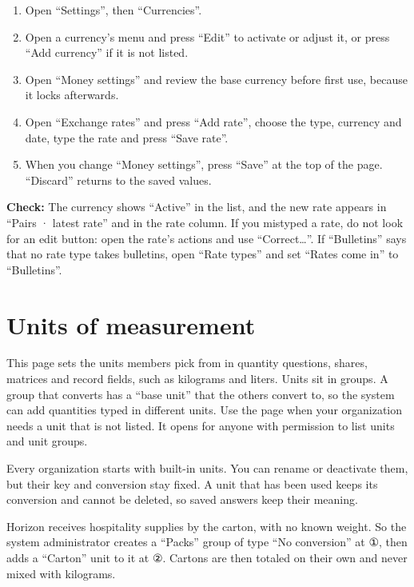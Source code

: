 \begin{enumerate}
\item Open “Settings”, then “Currencies”.
\item Open a currency’s menu and press “Edit” to activate or adjust it, or press “Add currency” if it is not listed.
\item Open “Money settings” and review the base currency before first use, because it locks afterwards.
\item Open “Exchange rates” and press “Add rate”, choose the type, currency and date, type the rate and press “Save rate”.
\item When you change “Money settings”, press “Save” at the top of the page. “Discard” returns to the saved values.
\end{enumerate}

\textbf{Check:} The currency shows “Active” in the list, and the new rate appears in “Pairs · latest rate” and in the rate column. If you mistyped a rate, do not look for an edit button: open the rate’s actions and use “Correct…”. If “Bulletins” says that no rate type takes bulletins, open “Rate types” and set “Rates come in” to “Bulletins”.

\section{Units of measurement}
\label{sec:settings-feature-units}

This page sets the units members pick from in quantity questions, shares, matrices and record fields, such as kilograms and liters. Units sit in groups. A group that converts has a “base unit” that the others convert to, so the system can add quantities typed in different units. Use the page when your organization needs a unit that is not listed. It opens for anyone with permission to list units and unit groups.

Every organization starts with built-in units. You can rename or deactivate them, but their key and conversion stay fixed. A unit that has been used keeps its conversion and cannot be deleted, so saved answers keep their meaning.

\begin{rcnote}
Horizon receives hospitality supplies by the carton, with no known weight. So the system administrator creates a “Packs” group of type “No conversion” at ①, then adds a “Carton” unit to it at ②. Cartons are then totaled on their own and never mixed with kilograms.
\end{rcnote}

